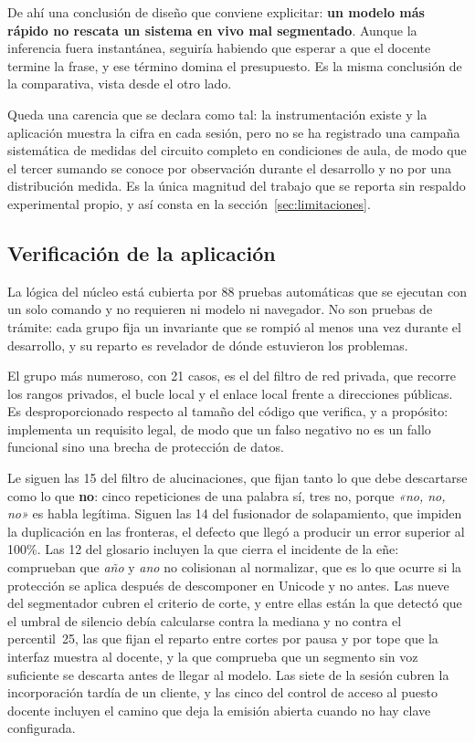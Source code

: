 De ahí una conclusión de diseño que conviene explicitar: \textbf{un modelo más rápido no
rescata un sistema en vivo mal segmentado}. Aunque la inferencia fuera instantánea, seguiría
habiendo que esperar a que el docente termine la frase, y ese término domina el
presupuesto. Es la misma conclusión de la comparativa, vista desde el otro lado.

Queda una carencia que se declara como tal: la instrumentación existe y la aplicación
muestra la cifra en cada sesión, pero no se ha registrado una campaña sistemática de medidas
del circuito completo en condiciones de aula, de modo que el tercer sumando se conoce por
observación durante el desarrollo y no por una distribución medida. Es la única magnitud del
trabajo que se reporta sin respaldo experimental propio, y así consta en la
sección~\ref{sec:limitaciones}.

\subsection{Verificación de la aplicación}

La lógica del núcleo está cubierta por 88 pruebas automáticas que se ejecutan con un solo
comando y no requieren ni modelo ni navegador. No son pruebas de trámite: cada grupo fija un
invariante que se rompió al menos una vez durante el desarrollo, y su reparto es revelador
de dónde estuvieron los problemas.

El grupo más numeroso, con 21 casos, es el del filtro de red privada, que recorre los
rangos privados, el bucle local y el enlace local frente a direcciones públicas. Es
desproporcionado respecto al tamaño del código que verifica, y a propósito: implementa un
requisito legal, de modo que un falso negativo no es un fallo funcional sino una brecha de
protección de datos.

Le siguen las 15 del filtro de alucinaciones, que fijan tanto lo que debe descartarse como
lo que \textbf{no}: cinco repeticiones de una palabra sí, tres no, porque \emph{«no, no,
no»} es habla legítima. Siguen las 14 del fusionador de solapamiento, que impiden la
duplicación en las fronteras, el defecto que llegó a producir un error superior al 100\%.
Las 12 del glosario incluyen la que cierra el incidente de la eñe: comprueban que
\emph{año} y \emph{ano} no colisionan al normalizar, que es lo que ocurre si la protección
se aplica después de descomponer en Unicode y no antes. Las nueve del segmentador cubren el
criterio de corte, y entre ellas están la que detectó que el umbral de silencio debía
calcularse contra la mediana y no contra el percentil~25, las que fijan el reparto entre
cortes por pausa y por tope que la interfaz muestra al docente, y la que comprueba que un
segmento sin voz suficiente se descarta antes de llegar al modelo. Las siete de la sesión
cubren la incorporación tardía de un cliente, y las cinco del control de acceso al puesto
docente incluyen el camino que deja la emisión abierta cuando no hay clave configurada.

